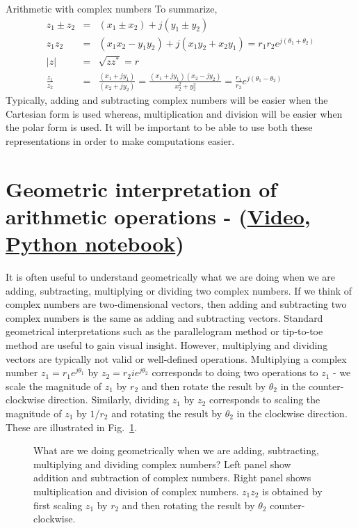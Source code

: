\begin{infobox}{Arithmetic with complex numbers}
To summarize,
\begin{eqnarray}
\label{eqn:complexadd} z_1 \pm z_2 & = & (x_1 \pm x_2) + j (y_1 \pm y_2) \\
\label{eqn:complexmult} z_1 z_2 & = & (x_1 x_2 - y_1 y_2) + j (x_1 y_2 + x_2 y_1) = r_1 r_2 e^{j (\theta_1+\theta_2)} \\
\nonumber |z| &=& \sqrt{zz^*} = r\\
\nonumber \frac{z_1}{z_2} &=& \frac{(x_1+jy_1)}{(x_2+jy_2)} = \frac{(x_1+jy_1)(x_2-jy_2)}{x_2^2+y_2^2} = \frac{r_1}{r_2} e^{j (\theta_1-\theta_2)}
\end{eqnarray}
Typically, adding and subtracting complex numbers will be easier when the Cartesian form is used whereas, multiplication and division will be easier when the polar form is used. It will be important to be able to use both these representations in order to make computations easier.
\end{infobox}


\section{Geometric interpretation of arithmetic operations - (\href{https://youtu.be/A0j17Gg3JCM}{Video},
\href{https://colab.research.google.com/drive/1IPisKbolmXp2UD7ZuxIRhMEjvaq_Q82G?usp=sharing}{Python notebook})}
It is often useful to understand geometrically what we are doing when we are adding, subtracting, multiplying or dividing two complex numbers.
If we think of complex numbers are two-dimensional vectors, then adding and subtracting two complex numbers is the same as adding and subtracting vectors.
Standard geometrical interpretations such as the parallelogram method or tip-to-toe method are useful to gain visual insight.
However, multiplying and dividing vectors are typically not valid or well-defined operations.
Multiplying a complex number $z_1 = r_1 e^{j \theta_1}$ by $z_2 = r_2 ie^{j \theta_2}$ corresponds to doing two operations to $z_1$ - we scale the magnitude of $z_1$ by $r_2$ and then rotate the result by $\theta_2$ in the counter-clockwise direction.
Similarly, dividing $z_1$ by $z_2$ corresponds to scaling the magnitude of $z_1$ by $1/r_2$ and rotating the result by $\theta_2$ in the clockwise direction.
These are illustrated in Fig.~\ref{fig:geometricinterpretation}.

\begin{figure}[h]
  \centering
  
  \caption{What are we doing geometrically when we are adding, subtracting, multiplying and dividing complex numbers?
  Left panel show addition and subtraction of complex numbers. Right panel shows multiplication and division of complex numbers.
  $z_1 z_2$ is obtained by first scaling $z_1$ by $r_2$ and then rotating the result by $\theta_2$ counter-clockwise.}
  \label{fig:geometricinterpretation}
\end{figure}


